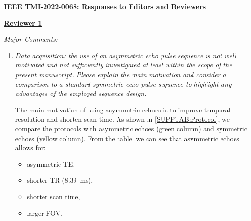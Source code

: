 \documentclass[a4paper,11pt]{report}
\begin{document}
	
\begin{center}
	{\large\textbf{IEEE TMI-2022-0068: Responses to Editors and Reviewers}}
\end{center}




\noindent \underline{\textbf{Reviewer 1}}

\noindent \textit{Major Comments:}

\begin{enumerate}
	\item \textit{Data acquisition: the use of an asymmetric echo pulse sequence is not well motivated and not sufficiently investigated at least within the scope of the present manuscript. Please explain the main motivation and consider a comparison to a standard symmetric echo pulse sequence to highlight any advantages of the employed sequence design.}

\hspace{1em} The main motivation of using asymmetric echoes is 
to improve temporal resolution and shorten scan time. 
As shown in \cref{SUPPTAB:Protocol}, we compare the protocols 
with asymmetric echoes (green column) and 
symmetric echoes (yellow column). 
From the table, we can see that asymmetric echoes allows for:

\begin{itemize}
	\item asymmetric TE,
	\item shorter TR ($8.39$~ms),
	\item shorter scan time,
	\item larger FOV.
\end{itemize}


\end{enumerate}
\end{document}
